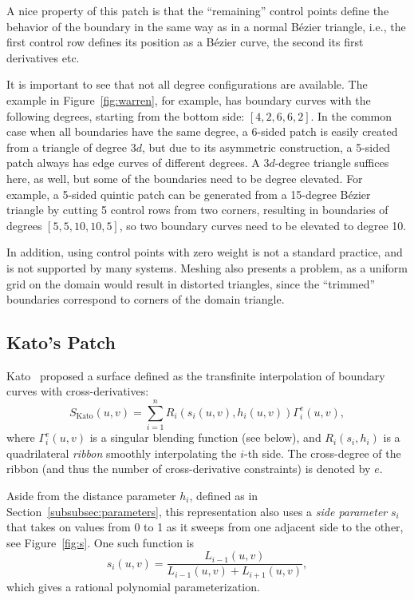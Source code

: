 \documentclass[9pt,academicons]{article}
\begin{document}
A nice property of this patch is that the ``remaining'' control points define the behavior of the
boundary in the same way as in a normal B\'ezier triangle, i.e., the first control row defines
its position as a B\'ezier curve, the second its first derivatives etc.

It is important to see that not all degree configurations are available.
The example in Figure~\ref{fig:warren}, for example, has boundary curves with the
following degrees, starting from the bottom side: $[4,2,6,6,2]$. In the common case
when all boundaries have the same degree, a 6-sided patch is easily created from 
a triangle of degree $3d$, but due to its asymmetric construction,
a 5-sided patch always has edge curves of different degrees.
A $3d$-degree triangle suffices here, as well, but some of the boundaries need to be
degree elevated. For example, a 5-sided quintic patch can be generated from a 15-degree
B\'ezier triangle by cutting 5 control rows from two corners, resulting in boundaries of
degrees $[5,5,10,10,5]$, so two boundary curves need to be elevated to degree 10.

In addition, using control points with zero
weight is not a standard practice, and is not supported by many systems. Meshing
also presents a problem, as a uniform grid on the domain would result in distorted triangles,
since the ``trimmed'' boundaries correspond to corners of the domain triangle.

\subsection{Kato's Patch}
\label{subsec:kato}
Kato~\cite{Kato:1991} proposed a surface defined as the transfinite interpolation of boundary
curves with cross-derivatives:
\begin{equation}
  S_\mathrm{Kato}(u,v)=\sum_{i=1}^nR_i(s_i(u,v),h_i(u,v))\Gamma_i^{e}(u,v),
\end{equation}
where $\Gamma_i^{e}(u,v)$ is a singular blending function (see below), and
$R_i(s_i,h_i)$ is a quadrilateral \emph{ribbon} smoothly interpolating the $i$-th side.
The cross-degree of the ribbon
(and thus the number of cross-derivative constraints) is denoted by $e$.

Aside from the distance parameter $h_i$, defined as in Section~\ref{subsubsec:parameters},
this representation also uses a \emph{side parameter} $s_i$
that takes on values from 0 to 1 as it sweeps from one adjacent side to the other,
see Figure~\ref{fig:s}.
One such function is
\begin{equation}
  s_i(u,v)=\frac{L_{i-1}(u,v)}{L_{i-1}(u,v)+L_{i+1}(u,v)},
\end{equation}
which gives a rational polynomial parameterization.
\end{document}
